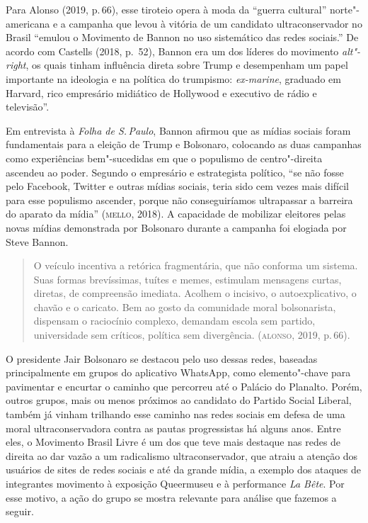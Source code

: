 Para Alonso (2019, p.\,66), esse tiroteio opera à moda da ``guerra
cultural'' norte"-americana e a campanha que levou à vitória de um
candidato ultraconservador no Brasil ``emulou o Movimento de Bannon no
uso sistemático das redes sociais.'' De acordo com Castells (2018, p.\,
52), Bannon era um dos líderes do movimento \textit{alt"-right}, os quais
tinham influência direta sobre Trump e desempenham um papel importante
na ideologia e na política do trumpismo: \textit{ex-marine}, graduado em
Harvard, rico empresário midiático de Hollywood e executivo de rádio e
televisão''.

Em entrevista à \textit{Folha de S.\,Paulo}, Bannon afirmou que as mídias
sociais foram fundamentais para a eleição de Trump e Bolsonaro,
colocando as duas campanhas como experiências bem"-sucedidas em que o
populismo de centro"-direita ascendeu ao poder. Segundo o empresário e
estrategista político, ``se não fosse pelo Facebook, Twitter e outras
mídias sociais, teria sido cem vezes mais difícil para esse populismo
ascender, porque não conseguiríamos ultrapassar a barreira do aparato da
mídia'' (\textsc{mello}, 2018). A capacidade de mobilizar eleitores pelas novas
mídias demonstrada por Bolsonaro durante a campanha foi elogiada por
Steve Bannon.

\begin{quote}
O veículo incentiva a retórica fragmentária, que não conforma um
sistema. Suas formas brevíssimas, tuítes e memes, estimulam mensagens
curtas, diretas, de compreensão imediata. Acolhem o incisivo, o
autoexplicativo, o chavão e o caricato. Bem ao gosto da comunidade moral
bolsonarista, dispensam o raciocínio complexo, demandam escola sem
partido, universidade sem críticos, política sem divergência. (\textsc{alonso},
2019, p.\,66).
\end{quote}

O presidente Jair Bolsonaro se destacou pelo uso dessas redes, baseadas
principalmente em grupos do aplicativo WhatsApp, como elemento"-chave
para pavimentar e encurtar o caminho que percorreu até o Palácio do
Planalto. Porém, outros grupos, mais ou menos próximos ao candidato do
Partido Social Liberal, também já vinham trilhando esse caminho nas
redes sociais em defesa de uma moral ultraconservadora contra as pautas
progressistas há alguns anos. Entre eles, o Movimento Brasil Livre é um
dos que teve mais destaque nas redes de direita ao dar vazão a um
radicalismo ultraconservador, que atraiu a atenção dos usuários de sites
de redes sociais e até da grande mídia, a exemplo dos ataques de
integrantes movimento à exposição Queermuseu e à performance \textit{La Bête}.
Por esse motivo, a ação do grupo se mostra relevante para análise que
fazemos a seguir.

